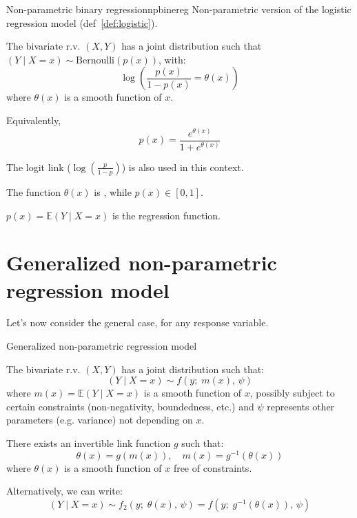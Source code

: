 \begin{definition}{Non-parametric binary regression}{npbinereg} 
    Non-parametric version of the logistic regression model (def~\ref{def:logistic}).

    The bivariate r.v. $(X, Y)$ has a joint distribution such that
    $(Y \mid X = x) \sim \text{Bernoulli}(p(x))$, with:
    \begin{equation*}
        \log\left(
            \frac{p(x)}{1 - p(x)} = \theta(x)
        \right)
    \end{equation*}
    where $\theta(x)$ is a smooth function of $x$.

    Equivalently,
    \begin{equation*}
        p(x) = \frac{e^{\theta(x)}}{1 + e^{\theta(x)}}
    \end{equation*}

    \tcblower

    The logit link ($\log\left(\frac{p}{1 - p}\right)$) is also used in this context.

    The function $\theta(x)$ is , while $p(x) \in [0, 1]$.

    $p(x) = \mathds{E}(Y \mid X = x)$ is the regression function.
\end{definition}


\pagebreak
\section{Generalized non-parametric regression model}
Let's now consider the general case, for any response variable.

\begin{definition}{Generalized non-parametric regression model}{}

    The bivariate r.v. $(X, Y)$ has a joint distribution such that:
    \begin{equation*}
        (Y \mid X = x) \sim f(y;\; m(x),\, \psi)
    \end{equation*}
    where $m(x) = \mathds{E}(Y \mid X = x)$ is a smooth function of $x$,
    possibly subject to certain constraints (non-negativity, boundedness, etc.)
    and $\psi$ represents other parameters (e.g. variance) not depending on $x$.

    There exists an invertible link function $g$ such that:
    \begin{equation*}
        \theta(x) = g(m(x)), \quad m(x) = g^{-1}(\theta(x))
    \end{equation*}
    where $\theta(x)$ is a smooth function of $x$ free of constraints.

    \tcblower

    Alternatively, we can write:
    \begin{equation*}
        (Y \mid X = x) \sim f_2(y;\; \theta(x),\, \psi) = f(y;\; g^{-1}(\theta(x)),\, \psi)
    \end{equation*}

\end{definition}

